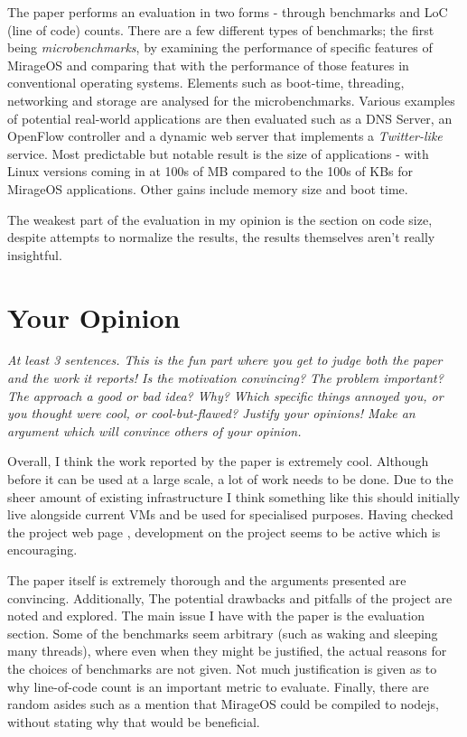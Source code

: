 \documentclass[11pt]{article}
\begin{document}
The paper performs an evaluation in two forms - through benchmarks and LoC
(line of code) counts. There are a few different types of benchmarks; the first
being \textit{microbenchmarks}, by examining the performance of specific
features of MirageOS and comparing that with the performance of those features
in conventional operating systems. Elements such as boot-time, threading,
networking and storage are analysed for the microbenchmarks. Various examples
of potential real-world applications are then evaluated such as a DNS Server,
an OpenFlow controller and a dynamic web server that implements a
\textit{Twitter-like} service. Most predictable but notable result is the size
of applications - with Linux versions coming in at 100s of MB compared to the
100s of KBs for MirageOS applications. Other gains include memory size and boot
time.


The weakest part of the evaluation in my opinion is the section on code size,
despite attempts to normalize the results, the results themselves aren't really
insightful.

\section*{Your Opinion}

\textsl{At least 3 sentences. This is the fun part where you get to judge both
the paper and the work it reports! Is the motivation convincing? The problem
important? The approach a good or bad idea? Why? Which specific things annoyed
you, or you thought were cool, or cool-but-flawed? Justify your opinions! Make
an argument which will convince others of your opinion.}

Overall, I think the work reported by the paper is extremely cool. Although
before it can be used at a large scale, a lot of work needs to be done. Due to
the sheer amount of existing infrastructure I think something like this should
initially live alongside current VMs and be used for specialised purposes.
Having checked the project web page \cite{MirageOSWeb}, development on the
project seems to be active which is encouraging.

The paper itself is extremely thorough and the arguments presented are
convincing. Additionally, The potential drawbacks and pitfalls of the project
are noted and explored. The main issue I have with the paper is the evaluation
section. Some of the benchmarks seem arbitrary (such as waking and sleeping
many threads), where even when they might be justified, the actual reasons for
the choices of benchmarks are not given. Not much justification is given as to
why line-of-code count is an important metric to evaluate. Finally, there are
random asides such as a mention that MirageOS could be compiled to nodejs,
without stating why that would be beneficial.
\end{document}
